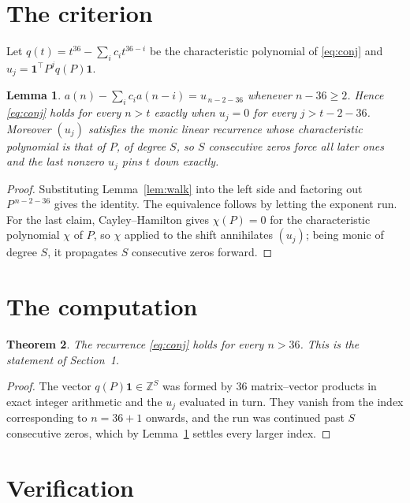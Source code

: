 \documentclass[11pt,a4paper]{article}
\theoremstyle{plain}
\newtheorem{theorem}{Theorem}
\newtheorem{lemma}[theorem]{Lemma}
\theoremstyle{definition}
\begin{document}
\section{The criterion}

Let $q(t)=t^{36}-\sum_i c_i t^{36-i}$ be the characteristic polynomial of
\eqref{eq:conj} and $u_j=\mathbf{1}^{\!\top}P^{j}q(P)\mathbf{1}$.

\begin{lemma}\label{lem:crit}
$a(n)-\sum_i c_i a(n-i)=u_{\,n-2-36}$ whenever $n-36\ge2$. Hence
\eqref{eq:conj} holds for every $n>t$ exactly when $u_j=0$ for every
$j>t-2-36$. Moreover $(u_j)$ satisfies the monic linear recurrence whose
characteristic polynomial is that of $P$, of degree $S$, so $S$ consecutive zeros force all
later ones and the last nonzero $u_j$ pins $t$ down exactly.
\end{lemma}

\begin{proof}
Substituting Lemma~\ref{lem:walk} into the left side and factoring out
$P^{\,n-2-36}$ gives the identity. The equivalence follows by letting the exponent
run. For the last claim, Cayley--Hamilton gives $\chi(P)=0$ for the characteristic
polynomial $\chi$ of $P$, so $\chi$ applied to the shift annihilates $(u_j)$; being monic of
degree $S$, it propagates $S$ consecutive zeros forward.
\end{proof}

\section{The computation}

\begin{theorem}
The recurrence \eqref{eq:conj} holds for every $n>36$. This is the statement of
Section~1.
\end{theorem}

\begin{proof}
The vector $q(P)\mathbf{1}\in\mathbb{Z}^{S}$ was formed by $36$ matrix--vector
products in exact integer arithmetic and the $u_j$ evaluated in turn. They vanish from the
index corresponding to $n=36+1$ onwards, and the run was continued past $S$ consecutive
zeros, which by Lemma~\ref{lem:crit} settles every larger index.
\end{proof}

\section{Verification}
\end{document}
